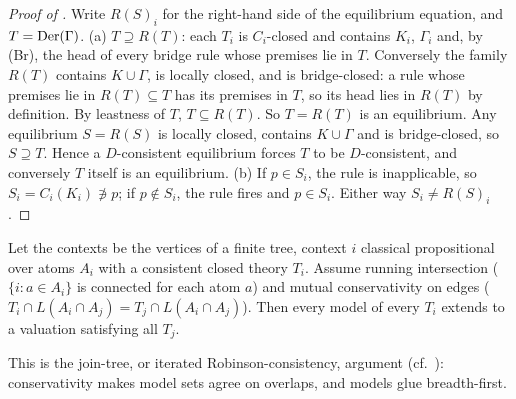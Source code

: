 \begin{proof}[Proof of ]
Write $R(S)_i$ for the right-hand side of the equilibrium equation, and $T=\mathrm{Der}(\Gamma)$.
(a) $T\supseteq R(T)$: each $T_i$ is $C_i$-closed and contains $K_i$, $\Gamma_i$ and, by (Br), the head of every bridge rule whose premises lie in $T$. Conversely the family $R(T)$ contains $K\cup\Gamma$, is locally closed, and is bridge-closed: a rule whose premises lie in $R(T)\subseteq T$ has its premises in $T$, so its head lies in $R(T)$ by definition. By leastness of $T$, $T\subseteq R(T)$. So $T=R(T)$ is an equilibrium. Any equilibrium $S=R(S)$ is locally closed, contains $K\cup\Gamma$ and is bridge-closed, so $S\supseteq T$. Hence a $D$-consistent equilibrium forces $T$ to be $D$-consistent, and conversely $T$ itself is an equilibrium.
(b) If $p\in S_i$, the rule is inapplicable, so $S_i=C_i(K_i)\not\ni p$; if $p\notin S_i$, the rule fires and $p\in S_i$. Either way $S_i\neq R(S)_i$.
\end{proof}

\begin{theorem}\label{thm:existence:tree}
Let the contexts be the vertices of a finite tree, context $i$ classical propositional over atoms $A_i$ with a consistent closed theory $T_i$. Assume running intersection ($\{i:a\in A_i\}$ is connected for each atom $a$) and mutual conservativity on edges ($T_i\cap L(A_i\cap A_j)=T_j\cap L(A_i\cap A_j)$). Then every model of every $T_i$ extends to a valuation satisfying all $T_j$.
\end{theorem}

This is the join-tree, or iterated Robinson-consistency, argument (cf.\ \citealt{beeri1983desirability}): conservativity makes model sets agree on overlaps, and models glue breadth-first.

